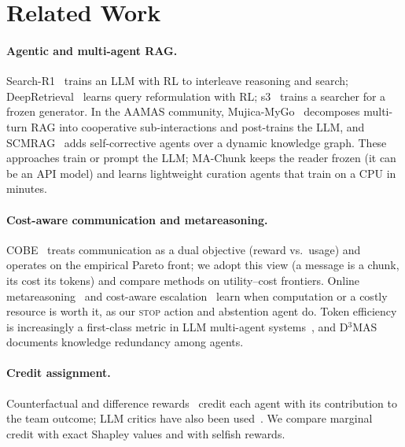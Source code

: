 \documentclass[sigconf,anonymous]{aamas}
\newcommand{\method}{MA-Chunk}
\theoremstyle{plain}
\theoremstyle{definition}
\begin{document}
\section{Related Work}

\paragraph{Agentic and multi-agent RAG.}
Search-R1~\cite{jin2025searchr1} trains an LLM with RL to interleave reasoning and search; DeepRetrieval~\cite{jiang2025deepretrieval} learns query reformulation with RL; s3~\cite{jiang2025s3} trains a searcher for a frozen generator. In the AAMAS community, Mujica-MyGo~\cite{wu2026mujica} decomposes multi-turn RAG into cooperative sub-interactions and post-trains the LLM, and SCMRAG~\cite{agrawal2025scmrag} adds self-corrective agents over a dynamic knowledge graph. These approaches train or prompt the LLM; \method{} keeps the reader frozen (it can be an API model) and learns lightweight curation agents that train on a CPU in minutes.

\paragraph{Cost-aware communication and metareasoning.}
COBE~\cite{lin2026cobe} treats communication as a dual objective (reward vs.\ usage) and operates on the empirical Pareto front; we adopt this view (a message is a chunk, its cost its tokens) and compare methods on utility--cost frontiers. Online metareasoning~\cite{budd2026thinkfast,russell1991metareasoning} and cost-aware escalation~\cite{bachar2026lpp} learn when computation or a costly resource is worth it, as our \textsc{stop} action and abstention agent do. Token efficiency is increasingly a first-class metric in LLM multi-agent systems~\cite{liu2026groupdebate,benkhaled2026g2cp,xiao2026routerhgc}, and D$^3$MAS~\cite{zhang2026d3mas} documents knowledge redundancy among agents.

\paragraph{Credit assignment.}
Counterfactual and difference rewards~\cite{wolpert2001difference,foerster2018coma} credit each agent with its contribution to the team outcome; LLM critics have also been used~\cite{nagpal2025llmmca}. We compare marginal credit with exact Shapley values and with selfish rewards.
\end{document}
